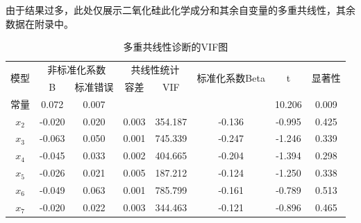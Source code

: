 \documentclass[UTF8]{ctexart}
\begin{document}
                由于结果过多，此处仅展示二氧化硅此化学成分和其余自变量的多重共线性，其余数据在附录中。
                \begin{table}[H]
                    \centering
                    \caption{多重共线性诊断的VIF图}
                    \begin{tabular}{|c|c|c|c|c|c|c|c|} \hline
                        \multirow{2}{*}{模型} & \multicolumn{2}{|c|}{非标准化系数} & \multicolumn{2}{|c|}{共线性统计} & \multirow{2}{*}{标准化系数Beta} & \multirow{2}{*}{t} & \multirow{2}{*}{显著性}                  \\ \cline{2-5}
                        ~                     & B                                  & 标准错误                         & 容差                            & VIF                &                         &        &       \\ \hline
                        常量                  & 0.072                              & 0.007                            & ~                               & ~                  & ~                       & 10.206 & 0.009 \\ \hline
                        $x_{2}$               & -0.020                             & 0.020                            & 0.003                           & 354.187            & -0.136                  & -0.995 & 0.425 \\ \hline
                        $x_{3}$               & -0.063                             & 0.050                            & 0.001                           & 745.339            & -0.247                  & -1.246 & 0.339 \\ \hline
                        $x_{4}$               & -0.045                             & 0.033                            & 0.002                           & 404.665            & -0.204                  & -1.394 & 0.298 \\ \hline
                        $x_{5}$               & -0.026                             & 0.021                            & 0.005                           & 187.212            & -0.124                  & -1.250 & 0.338 \\ \hline
                        $x_{6}$               & -0.049                             & 0.063                            & 0.001                           & 785.799            & -0.161                  & -0.789 & 0.513 \\ \hline
                        $x_{7}$               & -0.020                             & 0.022                            & 0.003                           & 344.463            & -0.121                  & -0.896 & 0.465 \\ \hline

\end{tabular}
\end{table}
\end{document}
